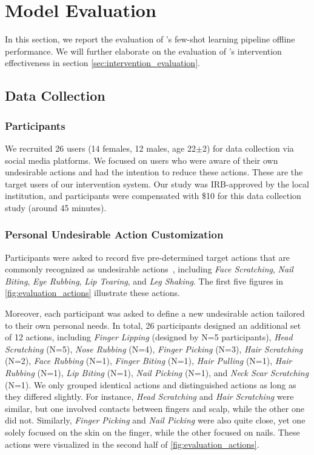 \section{Model Evaluation}
\label{sec:model_evaluation}
In this section, we report the evaluation of \projectname's few-shot learning pipeline offline performance. We will further elaborate on the evaluation of \projectname's intervention effectiveness in section \ref{sec:intervention_evaluation}.

\subsection{Data Collection}
\label{sub:model_evaluation:data_collection}
\subsubsection{Participants}
We recruited 26 users (14 females, 12 males, age 22$\pm$2) for data collection via social media platforms.
We focused on users who were aware of their own undesirable actions and had the intention to reduce these actions. These are the target users of our intervention system.
Our study was IRB-approved by the local institution, and participants were compensated with \$10 for this data collection study (around 45 minutes).

\subsubsection{Personal Undesirable Action Customization}

Participants were asked to record five pre-determined target actions that are commonly recognized as undesirable actions~\cite{teng2002body,oshio2018shake}, including \textit{Face Scratching}, \textit{Nail Biting}, \textit{Eye Rubbing}, \textit{Lip Tearing}, and \textit{Leg Shaking}. The first five figures in \autoref{fig:evaluation_actions} illustrate these actions.

Moreover, each participant was asked to define a new undesirable action tailored to their own personal needs.
In total, 26 participants designed an additional set of 12 actions, including \textit{Finger Lipping} (designed by N=5 participants), \textit{Head Scratching} (N=5), \textit{Nose Rubbing} (N=4), \textit{Finger Picking} (N=3), \textit{Hair Scratching} (N=2), \textit{Face Rubbing} (N=1), \textit{Finger Biting} (N=1), \textit{Hair Pulling} (N=1), \textit{Hair Rubbing} (N=1), \textit{Lip Biting} (N=1), \textit{Nail Picking} (N=1), and \textit{Neck Scar Scratching} (N=1).
We only grouped identical actions and distinguished actions as long as they differed slightly. For instance, \textit{Head Scratching} and  \textit{Hair Scratching} were similar, but one involved contacts between fingers and 
scalp, while the other one did not.
Similarly, \textit{Finger Picking} and \textit{Nail Picking} were also quite close, yet one solely focused on the skin on the finger, while the other focused on nails.
These actions were visualized in the second half of \autoref{fig:evaluation_actions}.


